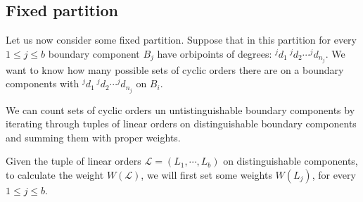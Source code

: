 \subsection{Fixed partition}
Let us now consider some fixed partition.
Suppose that in this partition for every $1\leq j \leq b$
boundary component $B_j$ have orbipoints of degrees: 
$^jd_1\ ^jd_2\cdots ^jd_{n_j}$.  
We want to know how many possible sets of cyclic orders there are on a boundary components with 
$^jd_1\ ^jd_2\cdots ^jd_{n_j}$ on $B_i$. 



We can count sets of cyclic orders un untistinguishable boundary components 
by iterating through tuples of 
linear orders on distinguishable boundary components and summing them with proper weights. 

Given the tuple of linear orders $\mathcal{L} = (L_1, \cdots, L_b)$ on
distinguishable components, to calculate 
the weight $W(\mathcal{L})$, we will first set some weights $W(L_j)$, for every 
$1\leq j \leq b$. 

